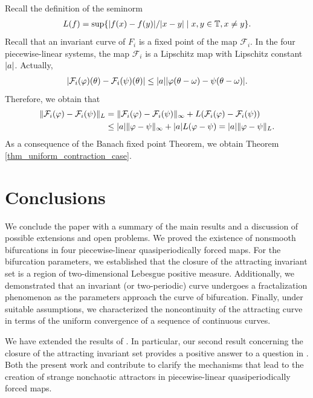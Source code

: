 \documentclass[12pt]{article}
\newcommand{\T}{\mathbb{T}}
\theoremstyle{plain}
\theoremstyle{remark}
\DeclarePairedDelimiter\abs{\lvert}{\rvert}
\DeclarePairedDelimiter\norm{\lVert}{\rVert}
\theoremstyle{definition}
\begin{document}
Recall the definition of the seminorm 
\begin{align*}
    L(f)=\sup\{\abs{f(x)-f(y)}/\abs{x-y}\mid x,y\in\T,x\not=y\}.
\end{align*}
Recall that an invariant curve of $F_i$ is a fixed point of the map $\mathcal{F}_i$.
In the four piecewise-linear systems, the map $\mathcal{F}_i$ is a Lipschitz map with Lipschitz constant $\abs{a}$. Actually,
\begin{align*}
    \abs{\mathcal{F}_i(\varphi)(\theta)-\mathcal{F}_i(\psi)(\theta)}\leq \abs{a}\abs{\varphi(\theta-\omega)-\psi(\theta-\omega)}.
\end{align*}
Therefore, we obtain that
\begin{align*}
    \norm{\mathcal{F}_i(\varphi)-\mathcal{F}_i(\psi)}_L &= \norm{\mathcal{F}_i(\varphi)-\mathcal{F}_i(\psi)}_\infty + L(\mathcal{F}_i(\varphi)-\mathcal{F}_i(\psi))\\     
    &\leq \abs{a}\norm{\varphi-\psi}_\infty + \abs{a} L(\varphi-\psi) = \abs{a}\norm{\varphi-\psi}_L.
\end{align*}
As a consequence of the Banach fixed point Theorem, we obtain Theorem \ref{thm_uniform_contraction_case}.

\section{Conclusions}
We conclude the paper with a summary of the main results and a discussion of possible extensions and open problems.
We proved the existence of nonsmooth bifurcations in four piecewise-linear quasiperiodically forced maps. For the bifurcation parameters, we established that the closure of the attracting invariant set is a region of two-dimensional Lebesgue positive measure. Additionally, we demonstrated that an invariant (or two-periodic) curve undergoes a fractalization phenomenon as the parameters approach the curve of bifurcation. Finally, under suitable assumptions, we characterized the noncontinuity of the attracting curve in terms of the uniform convergence of a sequence of continuous curves. 


We have extended the results of \cite{jorba2024nonsmooth}. In particular, our second result concerning the closure of the attracting invariant set provides a positive answer to a question in \cite{keller1996sna}. Both the present work and \cite{jorba2024nonsmooth} contribute to clarify the mechanisms that lead to the creation of strange nonchaotic attractors in piecewise-linear quasiperiodically forced maps.
\end{document}
